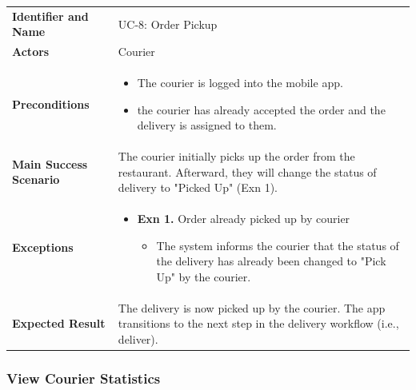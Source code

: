 \noindent
\begin{tabularx}{\textwidth}{l X}
    \textbf{Identifier and Name} & UC-8: Order Pickup \\
    \textbf{Actors} & Courier \\
    \textbf{Preconditions} & 
    \begin{itemize} 
        \item The courier is logged into the mobile app.
        \item the courier has already accepted the order and the delivery is assigned to them.
    \end{itemize} \\
    \textbf{Main Success Scenario} & The courier initially picks up the order from the restaurant. Afterward, they will change the status of delivery to "Picked Up" (Exn 1). \\
    \textbf{Exceptions} & 
    \begin{itemize} 
        \item \textbf{Exn 1.} Order already picked up by courier
        \begin{itemize}
            \item The system informs the courier that the status of the delivery has already been changed to "Pick Up" by the courier.
        \end{itemize}
    \end{itemize} \\
    \textbf{Expected Result} & The delivery is now picked up by the courier. The app transitions to the next step in the delivery workflow (i.e., deliver).
\end{tabularx}

\subsubsection{View Courier Statistics}

